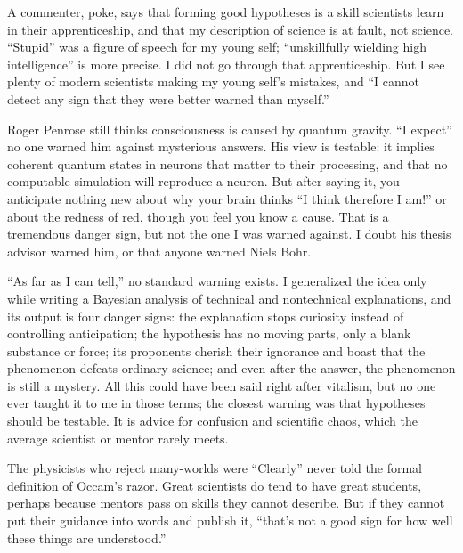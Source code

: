 
A commenter, poke, says that forming good hypotheses is a skill scientists learn in their apprenticeship, and that my description of science is at fault, not science. ``Stupid'' was a figure of speech for my young self; ``unskillfully wielding high intelligence'' is more precise. I did not go through that apprenticeship. But I see plenty of modern scientists making my young self's mistakes, and ``I cannot detect any sign that they were better warned than myself.''

Roger Penrose still thinks consciousness is caused by quantum gravity. ``I expect'' no one warned him against mysterious answers. His view is testable: it implies coherent quantum states in neurons that matter to their processing, and that no computable simulation will reproduce a neuron. But after saying it, you anticipate nothing new about why your brain thinks ``I think therefore I am!'' or about the redness of red, though you feel you know a cause. That is a tremendous danger sign, but not the one I was warned against. I doubt his thesis advisor warned him, or that anyone warned Niels Bohr. 

``As far as I can tell,'' no standard warning exists. I generalized the idea only while writing a Bayesian analysis of technical and nontechnical explanations, and its output is four danger signs: the explanation stops curiosity instead of controlling anticipation; the hypothesis has no moving parts, only a blank substance or force; its proponents cherish their ignorance and boast that the phenomenon defeats ordinary science; and even after the answer, the phenomenon is still a mystery. All this could have been said right after vitalism, but no one ever taught it to me in those terms; the closest warning was that hypotheses should be testable. It is advice for confusion and scientific chaos, which the average scientist or mentor rarely meets.

The physicists who reject many-worlds were ``Clearly'' never told the formal definition of Occam's razor.  Great scientists do tend to have great students, perhaps because mentors pass on skills they cannot describe. But if they cannot put their guidance into words and publish it, ``that's not a good sign for how well these things are understood.'' 

